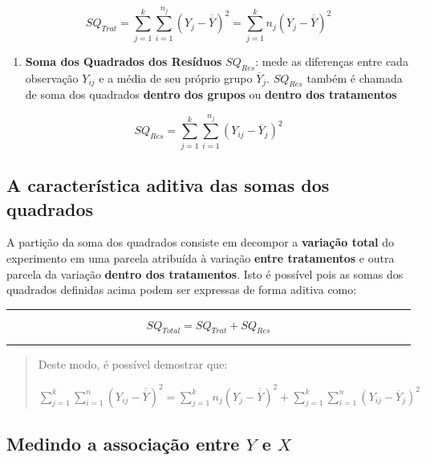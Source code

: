 \documentclass[
]{book}
\providecommand{\tightlist}{%
  \setlength{\itemsep}{0pt}\setlength{\parskip}{0pt}}
\begin{document}
\[SQ_{Trat} = \sum_{j = 1}^{k}\sum_{i = 1}^{n_{j}}(Y_{j} - \overline{\overline{Y}})^2 = \sum_{j = 1}^{k}n_{j}(Y_{j} - \overline{\overline{Y}})^2\]

\begin{enumerate}
\def\labelenumi{\roman{enumi}.}
\setcounter{enumi}{2}
\tightlist
\item
  \textbf{Soma dos Quadrados dos Resíduos} \(SQ_{Res}\): mede as diferenças entre cada observação \(Y_{ij}\) e a média de seu próprio grupo \(\overline{Y}_{j}\). \(SQ_{Res}\) também é chamada de soma dos quadrados \textbf{dentro dos grupos} ou \textbf{dentro dos tratamentos}
\end{enumerate}

\[SQ_{Res} = \sum_{j = 1}^{k}\sum_{i = 1}^{n_{j}}(Y_{ij} - \overline{Y}_{j})^2\]

\hypertarget{a-caracteruxedstica-aditiva-das-somas-dos-quadrados}{%
\subsection{A característica aditiva das somas dos quadrados}\label{a-caracteruxedstica-aditiva-das-somas-dos-quadrados}}

A partição da soma dos quadrados consiste em decompor a \textbf{variação total} do experimento em uma parcela atribuída à variação \textbf{entre tratamentos} e outra parcela da variação \textbf{dentro dos tratamentos}. Isto é possível pois as somas dos quadrados definidas acima podem ser expressas de forma aditiva como:

\begin{center}\rule{0.5\linewidth}{0.5pt}\end{center}

\[SQ_{Total} = SQ_{Trat} + SQ_{Res}\]

\begin{center}\rule{0.5\linewidth}{0.5pt}\end{center}

\begin{quote}
Deste modo, é possível demostrar que:

\(\sum_{j = 1}^{k}\sum_{i = 1}^{n}(Y_{ij} - \overline{\overline{Y}})^2 = \sum_{j = 1}^{k}n_{j}(Y_{j} - \overline{\overline{Y}})^2 + \sum_{j = 1}^{k}\sum_{i = 1}^{n}(Y_{ij} - \overline{Y}_{j})^2\)
\end{quote}

\hypertarget{medindo-a-associauxe7uxe3o-entre-y-e-x}{%
\subsection{\texorpdfstring{Medindo a associação entre \(Y\) e \(X\)}{Medindo a associação entre Y e X}}\label{medindo-a-associauxe7uxe3o-entre-y-e-x}}
\end{document}
